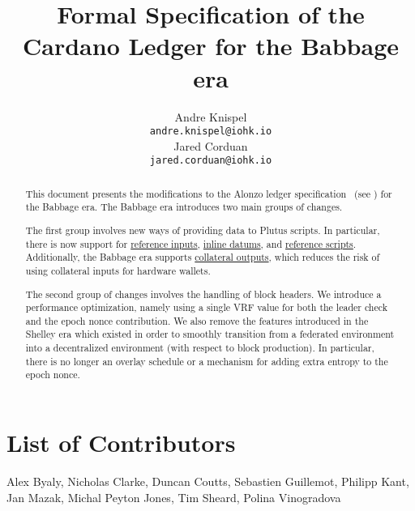 

\cleardoublepage
\renewcommand{\thepage}{\arabic{page}}
\setcounter{page}{1}

\title{Formal Specification of the Cardano Ledger for the Babbage era}

\author{
   Andre Knispel \\ {\small \texttt{andre.knispel@iohk.io}} \\
   Jared Corduan \\ {\small \texttt{jared.corduan@iohk.io}} \\
   }

\date{}

\maketitle

\begin{abstract}
This document presents the modifications to the Alonzo ledger specification~
(see \cite{alonzo_spec}) for the Babbage era.
The Babbage era introduces two main groups of changes.

The first group involves new ways of providing data to Plutus scripts.
In particular, there is now support for
\href{https://cips.cardano.org/cips/cip31/}{reference inputs},
\href{https://cips.cardano.org/cips/cip32/}{inline datums}, and
\href{https://cips.cardano.org/cips/cip33/}{reference scripts}.
Additionally, the Babbage era supports
\href{https://github.com/cardano-foundation/CIPs/pull/216}{collateral outputs},
which reduces the risk of using collateral inputs for hardware wallets.

The second group of changes involves the handling of block headers.
We introduce a performance optimization, namely using a single VRF value for both
the leader check and the epoch nonce contribution.
We also remove the features introduced in the Shelley era which existed in order
to smoothly transition from a federated environment into a decentralized environment
(with respect to block production).
In particular, there is no longer an overlay schedule or a mechanism for adding
extra entropy to the epoch nonce.
\end{abstract}

\section*{List of Contributors}
\label{acknowledgements}

Alex Byaly,
Nicholas Clarke,
Duncan Coutts,
Sebastien Guillemot,
Philipp Kant,
Jan Mazak,
Michal Peyton Jones,
Tim Sheard,
Polina Vinogradova
